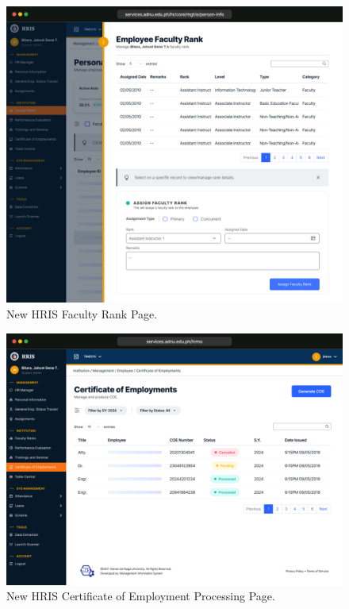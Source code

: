     \begin{figure}[H]
        \centering
        \includegraphics[width=1\linewidth]{figures/app/ranks.png}
        \caption{New HRIS Faculty Rank Page.}
        \label{fig:app-fac-rank}
    \end{figure}

    \begin{figure}[H]
        \centering
        \includegraphics[width=1\linewidth]{figures/app/coe.png}
        \caption{New HRIS Certificate of Employment Processing Page.}
        \label{fig:app-coe}
    \end{figure}

